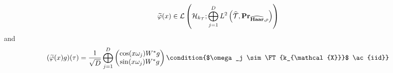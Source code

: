 \begin{dmath*}
    \tildePhi{\omega}(x)\in \mathcal{L}\left(\mathcal{H}_{k_{\mathcal{T}}};
    \Vect_{j=1}^D L^2\left(\dual{\mathcal{T}},
    \probability_{\dual{\Haar},\rho}\right)\right)
\end{dmath*}
and
\begin{dmath*}
    (\tildePhi{\omega}(x)g)(\tau) = \frac{1}{\sqrt{D}}\Vect_{j=1}^D
    \begin{pmatrix}
        \cos(x \omega_j) W^\adjoint g \\
        \sin(x \omega_j) W^\adjoint g
    \end{pmatrix} \condition{$\omega_j \sim \FT{k_{\mathcal{X}}}$
    \ac{iid}}
\end{dmath*}
